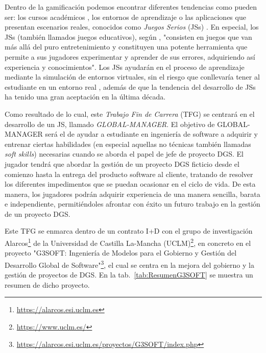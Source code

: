 Dentro de la gamificación podemos encontrar diferentes tendencias como pueden ser: los cursos académicos \cite{murphy2008distance}, los entornos de aprendizaje \cite{burnell2002teaching} o las aplicaciones que presentan escenarios reales, conocidos como \emph{Juegos Serios} (JSs) \cite{meneely2009preparing}. En especial, los JSs (también llamados juegos educativos), según \cite{calderon2018multivocal}, "consisten en juegos que van más allá del puro entretenimiento y constituyen una potente herramienta que permite a sus jugadores experimentar y aprender de sus errores, adquiriendo así experiencia y conocimientos". Los JSs ayudarán en el proceso de aprendizaje mediante la simulación de entornos virtuales, sin el riesgo que conllevaría tener al estudiante en un entorno real \cite{lino2015project, beecham2017best, calderon2018multivocal}, además de que la tendencia del desarrollo de JSs ha tenido una gran aceptación en la última década.

Como resultado de lo cual, este \emph{Trabajo Fin de Carrera} (TFG) se centrará en el desarrollo de un JS, llamado \emph{GLOBAL-MANAGER}. El objetivo de GLOBAL-MANAGER será el de ayudar a estudiante en ingeniería de software a adquirir y entrenar ciertas habilidades (en especial aquellas no técnicas también llamadas \emph{soft skills}) necesarias cuando se aborda el papel de jefe de proyecto DGS. El jugador tendrá que abordar la gestión de un proyecto DGS ficticio desde el comienzo hasta la entrega del producto software al cliente, tratando de resolver los diferentes impedimentos que se puedan ocasionar en el ciclo de vida. De esta manera, los jugadores podrán adquirir experiencia de una manera sencilla, barata e independiente, permitiéndoles afrontar con éxito un futuro trabajo en la gestión de un proyecto DGS.

Este TFG se enmarca dentro de un contrato I+D con el grupo de investigación Alarcos\footnote{\url{https://alarcos.esi.uclm.es}} de la Universidad de Castilla La-Mancha (UCLM)\footnote{\url{https://www.uclm.es/}}, en concreto en el proyecto "G3SOFT: Ingeniería de Modelos para el Gobierno y Gestión del Desarrollo Global de Software"\footnote{\url{https://alarcos.esi.uclm.es/proyectos/G3SOFT/index.php}}, el cual se centra en la mejora del gobierno y la gestión de proyectos de DGS. En la tab.~\ref{tab:ResumenG3SOFT} se muestra un resumen de dicho proyecto.

